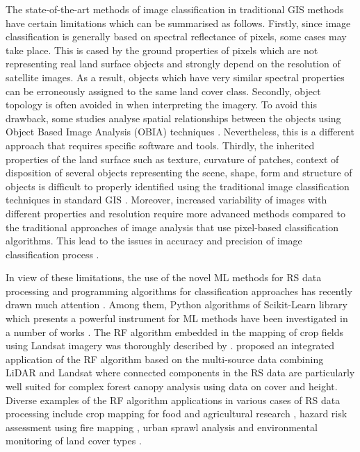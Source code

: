 \documentclass[climate,article,submit,pdftex,moreauthors]{Definitions/mdpi}
\begin{document}
The state-of-the-art methods of image classification in traditional GIS methods have certain limitations which can be summarised as follows. Firstly, since image classification is generally based on spectral reflectance of pixels, some cases may take place. This is cased by the ground properties of pixels which are not representing real land surface objects and strongly depend on the resolution of satellite images. As a result, objects which have very similar spectral properties can be erroneously assigned to the same land cover class. Secondly, object topology is often avoided in when interpreting the imagery. To avoid this drawback, some studies analyse spatial relationships between the objects using Object Based Image Analysis (OBIA) techniques \cite{LUCIANO2019127,PHIRI2018170,DEWALI20233109,MAO202011}. Nevertheless, this is a different approach that requires specific software and tools. Thirdly, the inherited properties of the land surface such as texture, curvature of patches, context of disposition of several objects representing the scene, shape, form and structure of objects is difficult to properly identified using the traditional image classification techniques in standard GIS \cite{OUSMANOU2024100239,ZHANG2023129590,BAKR2010592}. Moreover, increased variability of images with different properties and resolution require more advanced methods compared to the traditional approaches of image analysis that use pixel-based classification algorithms. This lead to the issues in accuracy and precision of image classification process \cite{Fisher,McKee}.

In view of these limitations, the use of the novel ML methods for RS data processing and programming algorithms for classification approaches has recently drawn much attention \cite{Ayhan}. Among them, Python algorithms of Scikit-Learn library which presents a powerful instrument for ML methods have been investigated in a number of works \cite{9884244,9883588,9006205,7724471}. The RF algorithm embedded in the mapping of crop fields using Landsat imagery was thoroughly described by \cite{LUCIANO2021106063}. \cite{AHMED201589} proposed an integrated application of the RF algorithm based on the multi-source data combining LiDAR and Landsat where connected components in the RS data are particularly well suited for complex forest canopy analysis using data on cover and height. Diverse examples of the RF algorithm applications in various cases of RS data processing include crop mapping for food and agricultural research \cite{OLIPHANT2019110,TELUGUNTLA2018325}, hazard risk assessment using fire mapping \cite{COLLINS2020111839}, urban sprawl analysis \cite{GHOSH201431} and environmental monitoring of land cover types \cite{MELVILLE201846,GRINAND201368}. 
\end{document}
